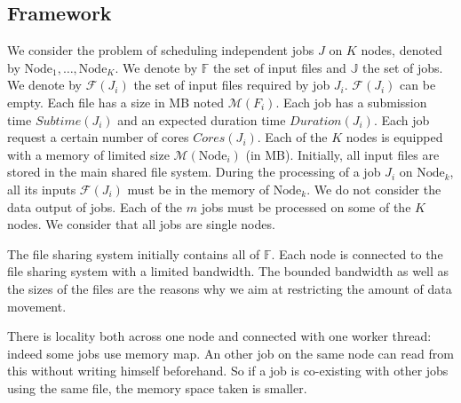 \documentclass[a4paper]{article}
\newcommand{\Node}[1]{\ensuremath{\mathrm{Node}_{#1}}\xspace}
\newcommand{\inputs}{\ensuremath{\mathcal{F}}\xspace}
\newcommand{\memory}{\ensuremath{\mathcal{M}}\xspace}
\newcommand{\duration}{\mathit{Duration}\xspace}
\newcommand{\core}{\mathit{Cores}\xspace}
\newcommand{\submissiontime}{\mathit{Subtime}\xspace}
\newcommand{\fileset}{\ensuremath{\mathbb{F}}\xspace}
\newcommand{\jobset}{\ensuremath{\mathbb{J}}\xspace}
\begin{document}
\subsection{Framework}
We consider the problem of scheduling independent jobs $J$ on $K$ nodes,
denoted by $\Node{1},\ldots, \Node{K}$.
We denote by $\fileset$ the set of input files and $\jobset$ the set of jobs.
We denote by $\inputs(J_i)$ the set of input files required by job $J_i$. $\inputs(J_i)$ can be empty.
Each file has a size in MB noted $\memory(F_i)$.
Each job has a submission time $\submissiontime(J_i)$ and an 
expected duration time $\duration(J_i)$.
Each job request a certain number of cores $\core(J_i)$. 
Each of the $K$ nodes is equipped with a memory of limited size $\memory(\Node{i})$ (in MB).
Initially, all input files are stored in the main shared file system.
During the processing of a job $J_i$ on $\Node{k}$, all its inputs
$\inputs(J_i)$ must be in the memory of $\Node{k}$. 
We do not consider the data output of jobs.
Each of the $m$ jobs must be processed on some of the $K$ nodes. 
We consider that all jobs are single nodes.


The file sharing system initially contains all of $\fileset$.
Each node is connected to the file sharing system with a limited bandwidth.
The bounded bandwidth as well as the sizes of the files are the reasons why
we aim at restricting the amount of data movement.


There is locality both across one node and connected with one worker thread:
indeed some jobs use memory map. An other job on the same node can read from this without writing himself beforehand. 
So if a job is co-existing with other jobs using the same file, the memory space taken is smaller.
\end{document}
